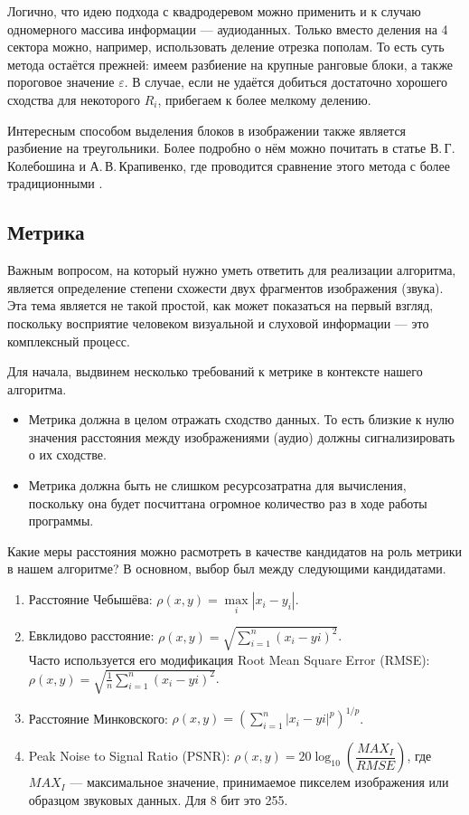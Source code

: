 \documentclass[bachelor,paper]{pmk-graduate}
\theoremstyle{definition}
\begin{document}
Логично, что идею подхода с квадродеревом можно применить и к случаю одномерного массива информации --- аудиоданных. Только вместо деления на 4 сектора можно, например, использовать деление отрезка пополам. То есть суть метода остаётся прежней: имеем разбиение на крупные ранговые блоки, а также пороговое значение $\varepsilon$. В случае, если не удаётся добиться достаточно хорошего сходства для некоторого $R_i$, прибегаем к более мелкому делению.

Интересным способом выделения блоков в изображении также является разбиение на треугольники. Более подробно о нём можно почитать в статье В.\,Г.\,Колебошина и А.\,В.\,Крапивенко, где проводится сравнение этого метода с более традиционными \cite{triangularDiv}.

\subsection{Метрика}

Важным вопросом, на который нужно уметь ответить для реализации алгоритма, является определение степени схожести двух фрагментов изображения (звука). Эта тема является не такой простой, как может показаться на первый взгляд, поскольку восприятие человеком визуальной и слуховой информации --- это комплексный процесс.

Для начала, выдвинем несколько требований к метрике в контексте нашего алгоритма.
\begin{itemize}
  \item Метрика должна в целом отражать сходство данных. То есть близкие к нулю значения расстояния между изображениями (аудио) должны сигнализировать о их сходстве.
  \item Метрика должна быть не слишком ресурсозатратна для вычисления, поскольку она будет посчиттана огромное количество раз в ходе работы программы.
\end{itemize}

Какие меры расстояния можно расмотреть в качестве кандидатов на роль метрики в нашем алгоритме? В основном, выбор был между следующими кандидатами.
\begin{enumerate}
  \item Расстояние Чебышёва: $\rho(x,y) = \max\limits_{i}|x_{i}-y_{i}|$.
  \item Евклидово расстояние: $\rho(x,y) = \sqrt{\sum\limits_{i = 1}^{n}(x_{i}-y{i})^2}$.\\Часто используется его модификация Root Mean Square Error (RMSE): \\$\rho(x,y) = \sqrt{\frac{1}{n}\sum\limits_{i = 1}^{n}(x_{i}-y{i})^2}$.
  \item Расстояние Минковского: $\rho(x,y) = (\sum\limits_{i = 1}^{n}|x_{i}-y{i}|^p)^{1/p}$.
  \item Peak Noise to Signal Ratio (PSNR): $\rho(x,y) = 20\log_{10}(\dfrac{MAX_I}{RMSE})$, где $MAX_I$ --- максимальное значение, принимаемое пикселем изображения или образцом звуковых данных. Для 8 бит это 255.
\end{enumerate}
\end{document}
